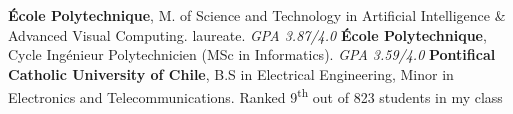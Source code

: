 %
%
%


\begin{scholarship}
    				{\textbf{École Polytechnique}, M. of Science and Technology in Artificial Intelligence \& Advanced Visual Computing. \textit{} laureate. \textit{GPA 3.87/4.0}
                    }
    \vspace{-1em}
    				{\textbf{École Polytechnique}, Cycle Ingénieur Polytechnicien (MSc in Informatics). \textit{GPA 3.59/4.0}
                    }
    \vspace{-1em}
					{\textbf{Pontifical Catholic University of Chile}, B.S in Electrical Engineering, Minor in Electronics and Telecommunications. Ranked 9\textsuperscript{th} out of 823 students in my class
                    }
\end{scholarship}
